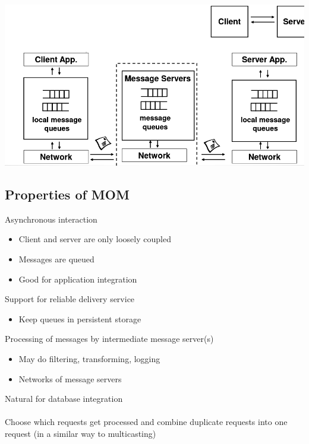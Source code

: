 \documentclass{article}[18pt]
\begin{document}
\begin{center}
	\includegraphics[scale=0.7]{MOM}
\end{center}
\subsection{Properties of MOM}
Asynchronous interaction
\begin{itemize}
	\item Client and server are only loosely coupled
	\item Messages are queued
	\item Good for application integration
\end{itemize}
Support for reliable delivery service
\begin{itemize}
	\item Keep queues in persistent storage
\end{itemize}
Processing of messages by intermediate message server(s)
\begin{itemize}
	\item May do filtering, transforming, logging
	\item Networks of message servers
\end{itemize}
Natural for database integration\\
\\
Choose which requests get processed and combine duplicate requests into one request (in a similar way to multicasting)
\end{document}
